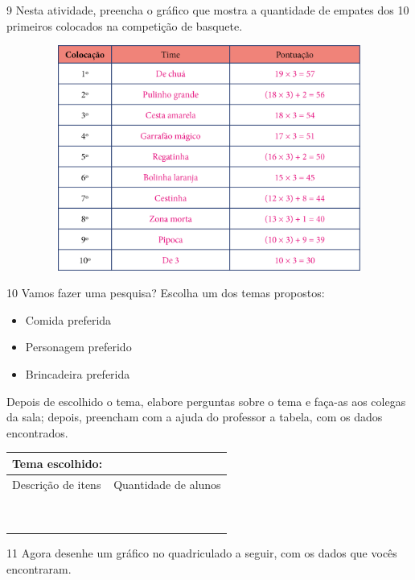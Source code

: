 \begin{escolha}
\begin{escolha}

\num{9} Nesta atividade, preencha o gráfico que mostra a quantidade de empates
dos 10 primeiros colocados na competição de basquete.


\includegraphics[width=6.20833in,height=2.91016in]{media/image95.png}


\num{10} Vamos fazer uma pesquisa? Escolha um dos temas propostos:

\begin{itemize}
\item
  Comida preferida
\item
  Personagem preferido
\item
  Brincadeira preferida
\end{itemize}

Depois de escolhido o tema, elabore perguntas sobre o tema e faça-as aos colegas da sala; depois,
preencham com a ajuda do professor a tabela, com os dados encontrados.

\begin{longtable}[]{@{}ll@{}}
\toprule
Tema escolhido:\tabularnewline
\midrule
\endhead
Descrição de itens & Quantidade de alunos\tabularnewline
&\tabularnewline
&\tabularnewline
&\tabularnewline
&\tabularnewline
&\tabularnewline
&\tabularnewline
&\tabularnewline
&\tabularnewline
&\tabularnewline
\bottomrule
\end{longtable}


\num{11} Agora desenhe um gráfico no quadriculado a seguir, com os dados que vocês
encontraram.


\end{escolha}
\end{escolha}
